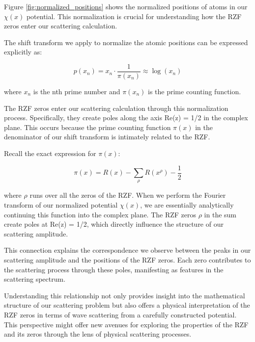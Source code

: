 \documentclass[11pt, oneside]{article}
\begin{document}
Figure \ref{fig:normalized_positions} shows the normalized positions of atoms in our $\chi(x)$ potential. This normalization is crucial for understanding how the RZF zeros enter our scattering calculation.


The shift transform we apply to normalize the atomic positions can be expressed explicitly as:

\begin{equation}
p(x_n) = x_n \cdot \frac{1}{\pi(x_n)} \approx \log(x_n)
\end{equation}

where $x_n$ is the nth prime number and $\pi(x_n)$ is the prime counting function.

The RZF zeros enter our scattering calculation through this normalization process. Specifically, they create poles along the axis Re(z) = 1/2 in the complex plane. This occurs because the prime counting function $\pi(x)$ in the denominator of our shift transform is intimately related to the RZF.

Recall the exact expression for $\pi(x)$:

\begin{equation}
\pi(x) = R(x) - \sum_{\rho}R(x^{\rho}) - \frac{1}{2}
\end{equation}

where $\rho$ runs over all the zeros of the RZF. When we perform the Fourier transform of our normalized potential $\chi(x)$, we are essentially analytically continuing this function into the complex plane. The RZF zeros $\rho$ in the sum create poles at Re(z) = 1/2, which directly influence the structure of our scattering amplitude.

This connection explains the correspondence we observe between the peaks in our scattering amplitude and the positions of the RZF zeros. Each zero contributes to the scattering process through these poles, manifesting as features in the scattering spectrum.

Understanding this relationship not only provides insight into the mathematical structure of our scattering problem but also offers a physical interpretation of the RZF zeros in terms of wave scattering from a carefully constructed potential. This perspective might offer new avenues for exploring the properties of the RZF and its zeros through the lens of physical scattering processes.
\end{document}
